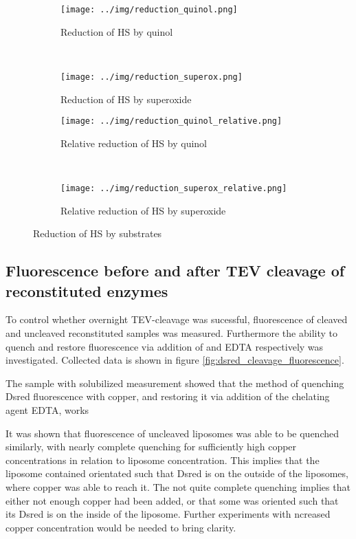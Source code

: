 \begin{figure*}
    \centering
    \begin{subfigure}{0.45\textwidth}
	\centering
	\texttt{[image: ../img/reduction\_quinol.png]}
	\caption{Reduction of HS by quinol}
	\label{fig:reduction_quinol}
    \end{subfigure}
    ~
    \begin{subfigure}{0.45\textwidth}
	\centering
	\texttt{[image: ../img/reduction\_superox.png]}
	\caption{Reduction of HS by superoxide}
	\label{fig:reduction_superox}
    \end{subfigure}

    \begin{subfigure}{0.45\textwidth}
	\centering
	\texttt{[image: ../img/reduction\_quinol\_relative.png]}
	\caption{Relative reduction of HS by quinol}
	\label{fig:reduction_quinol_relative}
    \end{subfigure}
    ~
    \begin{subfigure}{0.45\textwidth}
	\centering
	\texttt{[image: ../img/reduction\_superox\_relative.png]}
	\caption{Relative reduction of HS by superoxide}
	\label{fig:reduction_superox_relative}
    \end{subfigure}
    \caption{Reduction of HS by substrates}
    \label{fig:hs_reduction}
\end{figure*}


\subsection{Fluorescence before and after TEV cleavage of reconstituted enzymes}

To control whether overnight TEV-cleavage was sucessful, fluorescence of cleaved
and uncleaved reconstituted samples was measured. Furthermore the ability to
quench and restore fluorescence via addition of  and EDTA
respectively was investigated. Collected data is shown in figure
\ref{fig:dsred_cleavage_fluorescence}.

The sample with solubilized measurement showed that the method of quenching
Dsred fluorescence with copper, and restoring it via addition of the chelating
agent EDTA, works

It was shown that fluorescence of uncleaved liposomes was able to be quenched
similarly, with nearly complete quenching for sufficiently high copper
concentrations in relation to liposome concentration. This implies that the
liposome contained \hsdsred{} orientated such that Dsred is on the outside of the
liposomes, where copper was able to reach it. The not quite complete quenching
implies that either not enough copper had been added, or that some \hsdsred{} was
oriented such that its Dsred is on the inside of the liposome. Further
experiments with ncreased copper concentration would be needed to bring
clarity.

